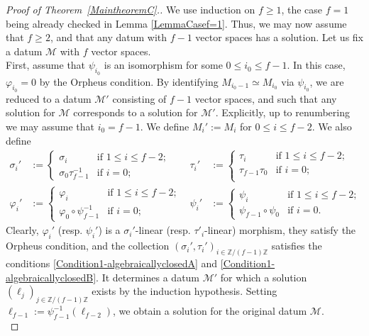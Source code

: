 \documentclass[12pt]{amsart}
\theoremstyle{definition}
\newcommand{\<}{\langle}   %
\renewcommand{\>}{\rangle} %
\begin{document}
\begin{proof}[Proof of Theorem~\ref{MaintheoremC}.]
    We use induction on $f \geq 1$, the case $f = 1$ being already checked in Lemma \ref{LemmaCasef=1}. Thus, we may now assume that $f \geq 2$, and that any datum with $f-1$ vector spaces has a solution. Let us fix a datum $\mathcal M$ with $f$ vector spaces.\\
    First, assume that $\psi_{i_0}$ is an isomorphism for some $0 \leq i_0 \leq f-1$. In this case, $\varphi_{i_0} = 0$ by the Orpheus condition. By identifying $M_{i_0-1} \simeq M_{i_0}$ via $\psi_{i_0}$, we are reduced to a datum $\mathcal M'$ consisting of $f-1$ vector spaces, and such that any solution for $\mathcal M$ corresponds to a solution for $\mathcal M'$. Explicitly, up to renumbering we may assume that $i_0 = f-1$. We define $M_i' := M_i$ for $0 \leq i \leq f-2$. We also define 
    \begin{align*}
        \sigma_i' & := \begin{cases}
            \sigma_i & \text{if } 1 \leq i \leq f-2;\\
            \sigma_{0}\tau^{-1}_{f-1} & \text{if } i = 0;
        \end{cases}
        & \tau_i' & := \begin{cases}
            \tau_i & \text{if } 1 \leq i \leq f-2;\\
            \tau_{f-1}\tau_0 & \text{if } i=0;\\
        \end{cases}
        \\
        \varphi_i' & := \begin{cases}
            \varphi_i & \text{if } 1 \leq i \leq f-2;\\
            \varphi_0\circ \psi_{f-1}^{-1} & \text{if } i=0;
        \end{cases}
        & \psi_i' & := \begin{cases}
            \psi_i & \text{if } 1 \leq i \leq f-2;\\
            \psi_{f-1}\circ\psi_0 & \text{if } i=0.
        \end{cases}
    \end{align*}
    Clearly, $\varphi_i'$ (resp. $\psi_i'$) is a $\sigma_i'$-linear (resp. $\tau'_i$-linear) morphism, they satisfy the Orpheus condition, and the collection $(\sigma_i',\tau_i')_{i \in \mathbb Z/(f-1)\mathbb Z}$ satisfies the conditions \ref{Condition1-algebraicallyclosedA} and \ref{Condition1-algebraicallyclosedB}. It determines a datum $\mathcal M'$ for which a solution $(\ell_j)_{j \in \mathbb Z/(f-1)\mathbb Z}$ exists by the induction hypothesis. Setting $\ell_{f-1} := \psi_{f-1}^{-1}(\ell_{f-2})$, we obtain a solution for the original datum $\mathcal M$.\\

\end{proof}
\end{document}

